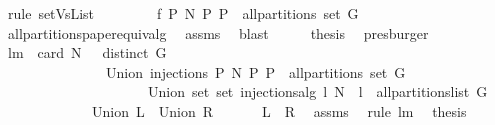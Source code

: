 \begin{isabellebody}
\ {\isacharparenleft}rule\ setVsList{\isacharparenright}\ \isamarkupfalse%
\isanewline
\ \ \isamarkupfalse%
\ \isamarkupfalse%
\ {\isachardoublequoteopen}{\isachardot}{\isachardot}{\isachardot}\ {\isacharequal}\ {\isacharbraceleft}{\isacharquery}f{}\ P\ N{\isacharbar}\ P{\isachardot}\ P\ {\isasymin}\ all{\isacharunderscore}partitions\ {\isacharparenleft}set\ G{\isacharparenright}{\isacharbraceright}{\isachardoublequoteclose}\ \isamarkupfalse%
\ all{\isacharunderscore}partitions{\isacharunderscore}paper{\isacharunderscore}equiv{\isacharunderscore}alg\isanewline
\ \ assms\ \isamarkupfalse%
\ blast\isanewline
\ \ \isamarkupfalse%
\ \isamarkupfalse%
\ {\isacharquery}thesis\ \isamarkupfalse%
\ presburger\isanewline
{}\isamarkupfalse%
%
\endisatagproof
{\isafoldproof}%
%
\isadelimproof
\isanewline
%
\endisadelimproof
\isanewline
\isanewline
{}\isamarkupfalse%
\ lm{}{}{\isacharcolon}\ \ {\isachardoublequoteopen}card\ N\ {\isachargreater}\ {}{\isachardoublequoteclose}\ {\isachardoublequoteopen}distinct\ G{\isachardoublequoteclose}\ \isanewline
\ \ \ \ \ \ \ \ \ \ \ \ \ \ \ {\isachardoublequoteopen}Union\ {\isacharbraceleft}injections\ P\ N{\isacharbar}\ P{\isachardot}\ P\ {\isasymin}\ all{\isacharunderscore}partitions\ {\isacharparenleft}set\ G{\isacharparenright}{\isacharbraceright}\ {\isacharequal}\isanewline
\ \ \ \ \ \ \ \ \ \ \ \ \ \ \ \ \ \ \ \ \ Union\ {\isacharparenleft}set\ {\isacharbrackleft}set\ {\isacharparenleft}injections{\isacharunderscore}alg\ l\ N{\isacharparenright}\ {\isachardot}\ l\ {\isasymleftarrow}\ all{\isacharunderscore}partitions{\isacharunderscore}list\ G{\isacharbrackright}{\isacharparenright}{\isachardoublequoteclose}\ \isanewline
\ \ \ \ \ \ \ \ \ \ \ \ {\isacharparenleft}\ {\isachardoublequoteopen}Union\ {\isacharquery}L\ {\isacharequal}\ Union\ {\isacharquery}R{\isachardoublequoteclose}{\isacharparenright}\isanewline
%
\isadelimproof
%
\endisadelimproof
%
\isatagproof
{}\isamarkupfalse%
\ {\isacharminus}\ \isanewline
\ \ \isamarkupfalse%
\ {\isachardoublequoteopen}{\isacharquery}L\ {\isacharequal}\ {\isacharquery}R{\isachardoublequoteclose}\ \isamarkupfalse%
\ assms\ \isamarkupfalse%
\ {\isacharparenleft}rule\ lm{}{}{\isacharparenright}\ \isamarkupfalse%
\ {\isacharquery}thesis\ \isamarkupfalse%

\end{isabellebody}

